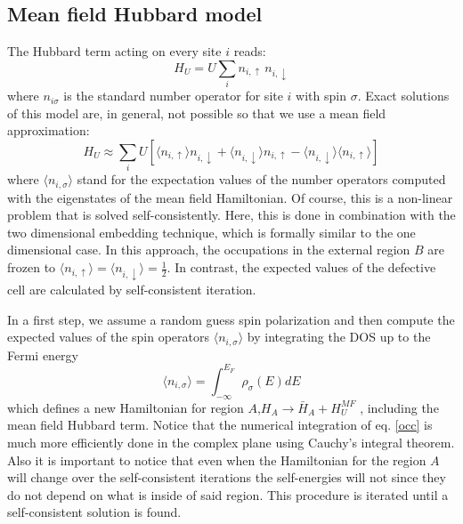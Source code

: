 \documentclass[aps,prb,twocolumn,superscriptaddress]{revtex4-1}
\begin{document}
\subsection{Mean field Hubbard model }
The Hubbard term acting on every site $i$ reads:
\begin{equation}
  H_{U} = U \sum_i n_{i,\uparrow}\,n_{i,\downarrow}
\end{equation}
where $n_{i\sigma}$ is the standard number operator for site $i$ with spin $\sigma$.
Exact solutions of this model are, in general, not possible so that we use a mean field approximation:
\begin{equation}
  H_{U} \approx \sum_i
  U \left[\langle n_{i,\uparrow} \rangle n_{i,\downarrow} +
    \langle n_{i,\downarrow} \rangle n_{i,\uparrow}  -
    \langle n_{i,\downarrow} \rangle \langle n_{i,\uparrow} \rangle
  \right]
\end{equation}
where $\langle n_{i,\sigma} \rangle$ stand for the expectation values of the number operators computed with the eigenstates of the mean field Hamiltonian.
Of course, this is a non-linear problem that is solved self-consistently.  Here, this is done in combination with the two dimensional embedding technique, which is formally similar to the one dimensional case.\cite{munoz2009}
In this approach, the occupations in the external region $B$ are frozen to $\langle n_{i,\uparrow}\rangle= \langle n_{i,\downarrow}\rangle=\frac{1}{2}$.  In contrast, the expected values of the defective cell are calculated by self-consistent iteration.


In a first step, we assume a random guess spin polarization and then compute the expected values of the spin operators $\langle n_{i,\sigma} \rangle$ by integrating the DOS up to the Fermi energy
\begin{equation}
 \langle n_{i,\sigma}\rangle= \int_{-\infty}^{E_F} \rho_{\sigma}(E) dE
 \label{occ}
\end{equation}
which defines a new Hamiltonian for region $A$,$H_A \rightarrow \bar H_A + H^{MF}_U$%
, including the mean field Hubbard term.\cite{Fernandez2007,Palacios2008} Notice that the numerical integration of eq. \eqref{occ} is much more efficiently done in the complex plane using Cauchy's integral theorem. Also it is important to notice that even when the Hamiltonian for the region $A$ will change over the self-consistent iterations the self-energies will not since they do not depend on what is inside of said region.
This procedure is iterated until a self-consistent solution is found.
\end{document}
